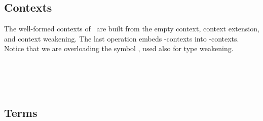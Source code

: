 \subsection{Contexts}
The well-formed contexts of \GTT\ are built from the empty context, context extension, and context weakening. The last operation embeds -contexts into -contexts. 
Notice that we are overloading the symbol , used also for type weakening.
\begin{AgdaAlign}
\begin{code}%
\>[0]\AgdaSpace{}%
\AgdaSpace{}%
\AgdaSymbol{:}\AgdaSpace{}%
\AgdaSpace{}%
\AgdaSpace{}%
\AgdaSpace{}%
\<%
\\
\>[0][@{}l@{\AgdaIndent{0}}]%
\>[2]\AgdaSpace{}%
\AgdaSymbol{:}\AgdaSpace{}%
\AgdaSpace{}%
\AgdaSymbol{\{}\AgdaSymbol{\}}\AgdaSpace{}%
\AgdaSpace{}%
\AgdaSpace{}%
\<%
\\
%
\>[2]\AgdaOperator{\AgdaInductiveConstructor{\AgdaUnderscore{},\AgdaUnderscore{}}}\AgdaSpace{}%
\AgdaSymbol{:}\AgdaSpace{}%
\AgdaSpace{}%
\AgdaSymbol{\{}\AgdaSymbol{\}}\AgdaSpace{}%
\AgdaSpace{}%
\AgdaSpace{}%
\AgdaSpace{}%
\AgdaSpace{}%
\AgdaSpace{}%
\AgdaSpace{}%
\AgdaSpace{}%
\AgdaSpace{}%
\<%
\\
%
\>[2]\AgdaSpace{}%
\AgdaSymbol{:}\AgdaSpace{}%
\AgdaSpace{}%
\AgdaSpace{}%
\AgdaSpace{}%
\AgdaSpace{}%
\<%
\end{code}
\end{AgdaAlign}


\subsection{Terms}

